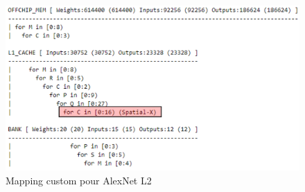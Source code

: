 \documentclass[10pt,letterpaper]{article}
\begin{document}
    \begin{figure}[H]
        \centering
        \includegraphics[width=0.9\linewidth]{map_custom_alex_L2.png}
        \caption{Mapping custom pour AlexNet L2}
        \label{fig:map_custom_alex_L2}
    \end{figure}
\end{document}

